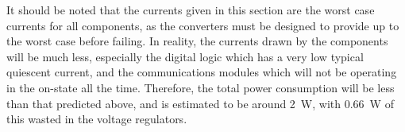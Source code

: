 It should be noted that the currents given in this section are the worst case currents for all components, as the converters must be designed to provide up to the worst case before failing. In reality, the currents drawn by the components will be much less, especially the digital logic which has a very low typical quiescent current, and the communications modules which will not be operating in the on-state all the time. Therefore, the total power consumption will be less than that predicted above, and is estimated to be around \SI{2}{\watt}, with \SI{0.66}{\watt} of this wasted in the voltage regulators.\\




